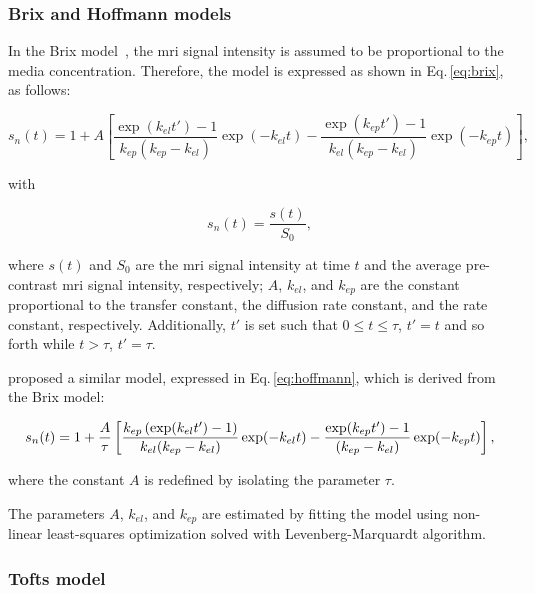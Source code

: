 \subsubsection{Brix and Hoffmann models}\label{sec:brixhoffmann}

In the Brix model~\citep{brix1991pharmacokinetic}, the \ac{mri} signal intensity is assumed to be proportional to the media concentration.
Therefore, the model is expressed as shown in Eq.\,\eqref{eq:brix}, as
follows:

\begin{equation}
  s_n(t) = 1 + A \left[ \frac{\exp(k_{el} t') - 1}{k_{ep}(k_{ep} - k_{el})} \exp(- k_{el} t) - \frac{\exp(k_{ep} t') - 1}{k_{el}(k_{ep} - k_{el})} \exp(- k_{ep} t) \right],
  \label{eq:brix}
\end{equation}

\noindent with

\begin{equation}
  s_n(t) = \frac{s(t)}{S_0},
  \label{eq:enh}
\end{equation}

\noindent where $s(t)$ and $S_0$ are the \ac{mri} signal intensity at time $t$ and the average pre-contrast \ac{mri} signal intensity, respectively; $A$, $k_{el}$, and $k_{ep}$ are the constant proportional to the transfer constant, the diffusion rate constant, and the rate constant, respectively.
Additionally, $t'$ is set such that $0 \leq t \leq \tau$, $t' = t$ and
so forth while $t > \tau$, $t' = \tau$.

\citeauthor{hoffmann1995pharmacokinetic} proposed a similar model,
expressed in Eq.\,\eqref{eq:hoffmann}, which is derived from the Brix model:

\begin{equation}
  \small
  s_n(t) = 1 + \frac{A}{\tau} \left[ \frac{k_{ep} \left( \exp(k_{el} t') - 1 \right)}{k_{el}(k_{ep} - k_{el})} \exp(- k_{el} t) - \frac{\exp(k_{ep} t') - 1}{(k_{ep} - k_{el})} \exp(- k_{ep} t) \right] ,
  \label{eq:hoffmann}
\end{equation}

\noindent where the constant $A$ is redefined by isolating the parameter $\tau$.

The parameters $A$, $k_{el}$, and $k_{ep}$ are estimated by fitting
the model using non-linear least-squares optimization solved with
Levenberg-Marquardt algorithm.

\subsubsection{Tofts model}\label{sec:tofts}

